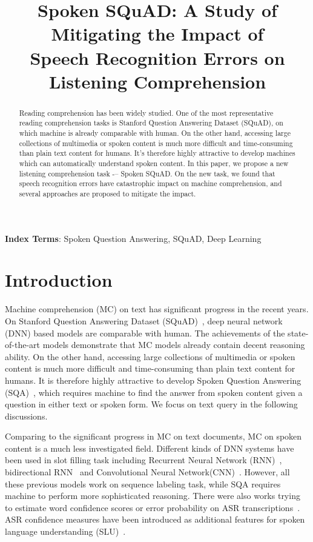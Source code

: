 \documentclass[a4paper]{article}
\title{Spoken SQuAD: A Study of Mitigating the Impact of \\ Speech Recognition Errors on Listening Comprehension}
\begin{document}
\maketitle
\begin{abstract}
Reading comprehension has been widely studied. One of the most representative reading comprehension tasks is Stanford Question Answering Dataset (SQuAD), on which machine is already comparable with human. 
On the other hand, accessing large collections of  multimedia or spoken content is much more difficult and time-consuming than  plain text content for humans. It's therefore highly attractive to develop machines which can automatically understand spoken content.
In this paper, we propose a new listening comprehension task -– Spoken SQuAD. On the new task, we found that speech recognition errors have catastrophic impact on machine comprehension, and several approaches are proposed to mitigate the impact.
\end{abstract} 
\noindent\textbf{Index Terms}:  Spoken Question Answering, SQuAD, Deep Learning

\section{Introduction}
Machine comprehension (MC) on text has significant progress in the recent years.
On Stanford Question Answering Dataset (SQuAD)~\cite{rajpurkar2016squad}, deep neural network (DNN) based models are  comparable with human. The achievements of the state-of-the-art models demonstrate that MC models already contain decent reasoning ability. 
On the other hand, accessing large collections of  multimedia or spoken content is much more difficult and time-consuming than  plain text content for humans. 
It is therefore highly attractive to develop Spoken Question Answering (SQA)~\cite{ispoken,comas2012factoid,turmo2008overview,comas2012sibyl}, which requires machine to find the answer from spoken content given a question in either text or spoken form. 
We focus on text query in the following discussions.

Comparing to the significant progress in MC on text documents, MC on spoken content is a much less investigated field.
Different kinds of DNN systems have been used in slot filling task including Recurrent Neural Network (RNN)~\cite{mesnil2015using,simonnet2015exploring}, bidirectional RNN~\cite{hakkani2016multi} and Convolutional Neural Network(CNN)~\cite{vu2016sequential,deoras2013joint}.
However, all these previous models work on sequence labeling task, while SQA requires machine to perform more sophisticated reasoning. 
There were also works trying to estimate word confidence scores or error probability on ASR transcriptions~\cite{hakkani2006beyond,tur2002improving,yu2016abstractive,shiang2014spoken,ghannay2016acoustic,ghannay2015combining,tam2014asr,chen2013asr,zukerman2017improving,bechet2013asr}.
ASR confidence measures have been introduced as additional features for spoken language understanding (SLU)~\cite{simonnet2017asr}.
\end{document}
